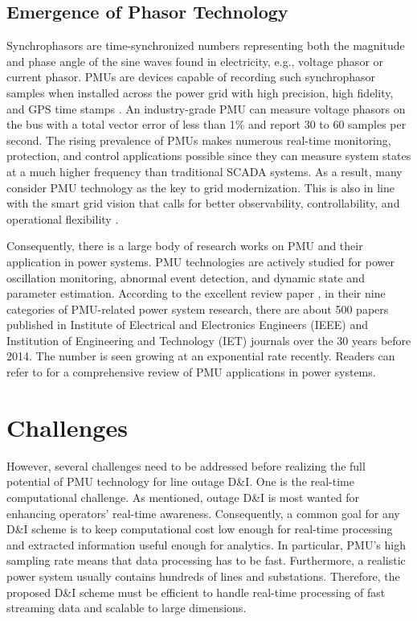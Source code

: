 \subsection{Emergence of Phasor Technology}
Synchrophasors are time-synchronized numbers representing both the magnitude and phase angle of the sine waves found in electricity, e.g., voltage phasor or current phasor. PMUs are devices capable of recording such synchrophasor samples when installed across the power grid with high precision, high fidelity, and GPS time stamps \cite{Aminifar2014}. An industry-grade PMU can measure voltage phasors on the bus with a total vector error of less than 1\% and report 30 to 60 samples per second. The rising prevalence of PMUs makes numerous real-time monitoring, protection, and control applications possible since they can measure system states at a much higher frequency than traditional SCADA systems. As a result, many consider PMU technology as the key to grid modernization. This is also in line with the smart grid vision that calls for better observability, controllability, and operational flexibility \cite{Panteli2015}. 

Consequently, there is a large body of research works on PMU and their application in power systems. PMU technologies are actively studied for power oscillation monitoring, abnormal event detection, and dynamic state and parameter estimation. According to the excellent review paper \cite{Aminifar2014}, in their nine categories of PMU-related power system research, there are about 500 papers published in Institute of Electrical and Electronics Engineers (IEEE) and Institution of Engineering and Technology (IET) journals over the 30 years before 2014. The number is seen growing at an exponential rate recently. Readers can refer to \cite{Aminifar2014} for a comprehensive review of PMU applications in power systems.


\section{Challenges}
However, several challenges need to be addressed before realizing the full potential of PMU technology for line outage D\&I. 
One is the real-time computational challenge. As mentioned, outage D\&I is most wanted for enhancing operators’ real-time awareness. Consequently, a common goal for any D\&I scheme is to keep computational cost low enough for real-time processing and extracted information useful enough for analytics.
In particular, PMU’s high sampling rate means that data processing has to be fast. Furthermore, a realistic power system usually contains hundreds of lines and substations. Therefore, the proposed D\&I scheme must be efficient to handle real-time processing of fast streaming data and scalable to large dimensions.


